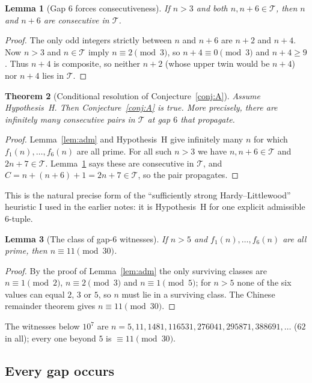 \documentclass[11pt,a4paper]{article}
\newtheorem{theorem}{Theorem}[section]
\newtheorem{lemma}[theorem]{Lemma}
\theoremstyle{definition}
\theoremstyle{remark}
\newcommand{\T}{\mathcal{T}}
\begin{document}
\begin{lemma}[Gap $6$ forces consecutiveness]\label{lem:gap6}
If $n>3$ and both $n, n+6\in\T$, then $n$ and $n+6$ are consecutive in $\T$.
\end{lemma}

\begin{proof}
The only odd integers strictly between $n$ and $n+6$ are $n+2$ and $n+4$.
Now $n>3$ and $n\in\T$ imply $n\equiv 2\pmod 3$, so $n+4\equiv 0\pmod 3$ and $n+4\ge 9$.
Thus $n+4$ is composite, so neither $n+2$ (whose upper twin would be $n+4$) nor $n+4$ lies in $\T$.
\end{proof}

\begin{theorem}[Conditional resolution of Conjecture~\ref{conj:A}]\label{thm:A}
Assume Hypothesis~H. Then Conjecture~\ref{conj:A} is true.
More precisely, there are infinitely many consecutive pairs in $\T$ at gap $6$ that propagate.
\end{theorem}

\begin{proof}
Lemma~\ref{lem:adm} and Hypothesis~H give infinitely many $n$ for which $f_1(n),\dots,f_6(n)$ are all prime.
For all such $n>3$ we have $n, n+6\in\T$ and $2n+7\in\T$.
Lemma~\ref{lem:gap6} says these are consecutive in $\T$, and $C = n+(n+6)+1 = 2n+7\in\T$, so the pair propagates.
\end{proof}

This is the natural precise form of the ``sufficiently strong Hardy--Littlewood'' heuristic I used in the earlier notes: it is Hypothesis~H for one explicit admissible $6$-tuple.

\begin{lemma}[The class of gap-$6$ witnesses]\label{lem:mod30}
If $n>5$ and $f_1(n),\dots,f_6(n)$ are all prime, then $n\equiv 11\pmod{30}$.
\end{lemma}

\begin{proof}
By the proof of Lemma~\ref{lem:adm} the only surviving classes are $n\equiv 1\pmod 2$, $n\equiv 2\pmod 3$ and $n\equiv 1\pmod 5$; for $n>5$ none of the six values can equal $2$, $3$ or $5$, so $n$ must lie in a surviving class.
The Chinese remainder theorem gives $n\equiv 11\pmod{30}$.
\end{proof}

The witnesses below $10^7$ are $n = 5, 11, 1481, 116531, 276041, 295871, 388691, \dots$ ($62$ in all); every one beyond $5$ is $\equiv 11\pmod{30}$.

\subsection{Every gap occurs}
\end{document}
